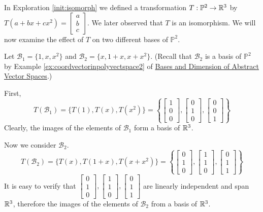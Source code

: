 \documentclass{ximera}
\begin{document}
\begin{exploration}\label{init:basestobasesiso}
In Exploration \ref{init:isomorph} we defined a transformation $T:\mathbb{P}^2\rightarrow \mathbb{R}^3$ by
$T(a+bx+cx^2)=\begin{bmatrix}a\\b\\c\end{bmatrix}$. We later observed that  $T$ is an isomorphism.  We will now examine the effect of $T$ on two different bases of $\mathbb{P}^2$.

Let 
$\mathcal{B}_1=\{1, x, x^2\}$ and $\mathcal{B}_2=\{x, 1+x, x+x^2\}$.  (Recall that $\mathcal{B}_2$ is a basis of $\mathbb{P}^2$ by Example \ref{ex:coordvectorinpolyvectspace2} of \href{https://ximera.osu.edu/oerlinalg/LinearAlgebra/VSP-0060/main}{Bases and Dimension of Abstract Vector Spaces}.)

First,
$$T(\mathcal{B}_1)=\{T(1), T(x), T(x^2)\}=\left\{\begin{bmatrix}1\\0\\0\end{bmatrix}, \begin{bmatrix}0\\1\\0\end{bmatrix}, \begin{bmatrix}0\\0\\1\end{bmatrix}\right\}$$
Clearly, the images of the elements of $\mathcal{B}_1$ form a basis of $\mathbb{R}^3$.

Now we consider $\mathcal{B}_2$.
$$T(\mathcal{B}_2)=\{T(x), T(1+x), T(x+x^2)\}=\left\{\begin{bmatrix}0\\1\\0\end{bmatrix}, \begin{bmatrix}1\\1\\0\end{bmatrix}, \begin{bmatrix}0\\1\\1\end{bmatrix}\right\}$$
It is easy to verify that $\begin{bmatrix}0\\1\\0\end{bmatrix}, \begin{bmatrix}1\\1\\0\end{bmatrix}, \begin{bmatrix}0\\1\\1\end{bmatrix}$ are linearly independent and span $\mathbb{R}^3$, therefore the images of the elements of $\mathcal{B}_2$ from a basis of $\mathbb{R}^3$.

\end{exploration}
\end{document}
